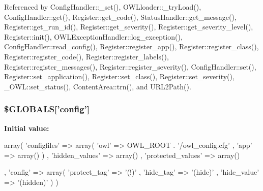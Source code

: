 Referenced by ConfigHandler::\_\-set(), OWLloader::\_\-tryLoad(), ConfigHandler::get(), Register::get\_\-code(), StatusHandler::get\_\-message(), Register::get\_\-run\_\-id(), Register::get\_\-severity(), Register::get\_\-severity\_\-level(), Register::init(), OWLExceptionHandler::log\_\-exception(), ConfigHandler::read\_\-config(), Register::register\_\-app(), Register::register\_\-class(), Register::register\_\-code(), Register::register\_\-labels(), Register::register\_\-messages(), Register::register\_\-severity(), ConfigHandler::set(), Register::set\_\-application(), Register::set\_\-class(), Register::set\_\-severity(), \_\-OWL::set\_\-status(), ContentArea::trn(), and URL2Path().

\subsubsection[{\$GLOBALS}]{\setlength{\rightskip}{0pt plus 5cm}\$GLOBALS\mbox{[}'config'\mbox{]}}\label{config_8php_ab954a2cc6c5b7053b6cabb0c8dea38d1}
{\bfseries Initial value:}
\begin{DoxyCode}
 array(
          'configfiles'                 => array(
                                  'owl' => OWL_ROOT . '/owl_config.cfg'
                                , 'app' => array()
        )
        , 'hidden_values'               => array()
        , 'protected_values'    => array()

        , 'config'                              => array(
                                  'protect_tag' => '(!)'
                                , 'hide_tag'    => '(hide)'
                                , 'hide_value'  => '(hidden)'
        )
)
\end{DoxyCode}
